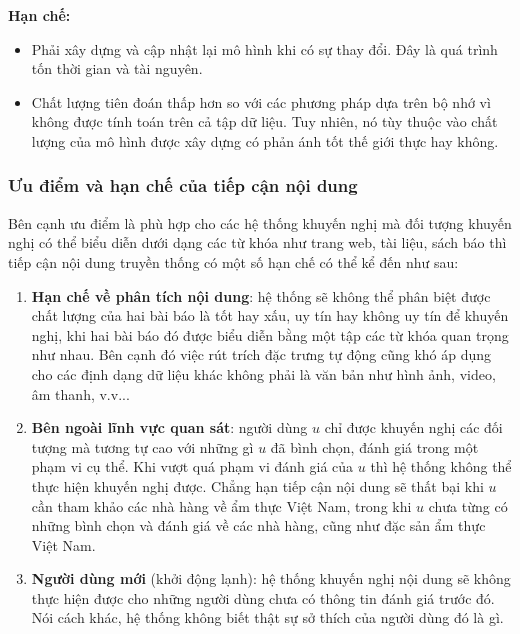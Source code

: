 \textbf{Hạn chế:}
\begin{itemize}
	\item Phải xây dựng và cập nhật lại mô hình khi có sự thay đổi. Đây là quá trình tốn thời gian và tài nguyên.
	\item Chất lượng tiên đoán thấp hơn so với các phương pháp dựa trên bộ nhớ vì không được tính toán trên cả tập dữ liệu. Tuy nhiên, nó tùy thuộc vào chất lượng của mô hình được xây dựng có phản ánh tốt thế giới thực hay không.
\end{itemize}

\subsubsection{Ưu điểm và hạn chế của tiếp cận nội dung}
Bên cạnh ưu điểm là phù hợp cho các hệ thống khuyến nghị mà đối tượng khuyến nghị có thể biểu diễn dưới dạng các từ khóa như trang web, tài liệu, sách báo thì tiếp cận nội dung truyền thống có một số hạn chế có thể kể đến như sau:
\begin{enumerate}
\item \textbf{Hạn chế về phân tích nội dung}: hệ thống sẽ không thể phân biệt được chất lượng của hai bài báo là tốt hay xấu, uy tín hay không uy tín để khuyến nghị, khi hai bài báo đó được biểu diễn bằng một tập các từ khóa quan trọng như nhau. Bên cạnh đó việc rút trích đặc trưng tự động cũng khó áp dụng cho các định dạng dữ liệu khác không phải là văn bản như hình ảnh, video, âm thanh, v.v... 
\item \textbf{Bên ngoài lĩnh vực quan sát}: người dùng $u$ chỉ được khuyến nghị các đối tượng mà tương tự cao với những gì $u$ đã bình chọn, đánh giá trong một phạm vi cụ thể. Khi vượt quá phạm vi đánh giá của $u$ thì hệ thống không thể thực hiện khuyến nghị được. Chẳng hạn tiếp cận nội dung sẽ thất bại khi $u$ cần tham khảo các nhà hàng về ẩm thực Việt Nam, trong khi $u$ chưa từng có những bình chọn và đánh giá về các nhà hàng, cũng như đặc sản ẩm thực Việt Nam. 
\item \textbf{Người dùng mới} (khởi động lạnh): hệ thống khuyến nghị nội dung sẽ không thực hiện được cho những người dùng chưa có thông tin đánh giá trước đó. Nói cách khác, hệ thống không biết thật sự sở thích của người dùng đó là gì.
\end{enumerate}

